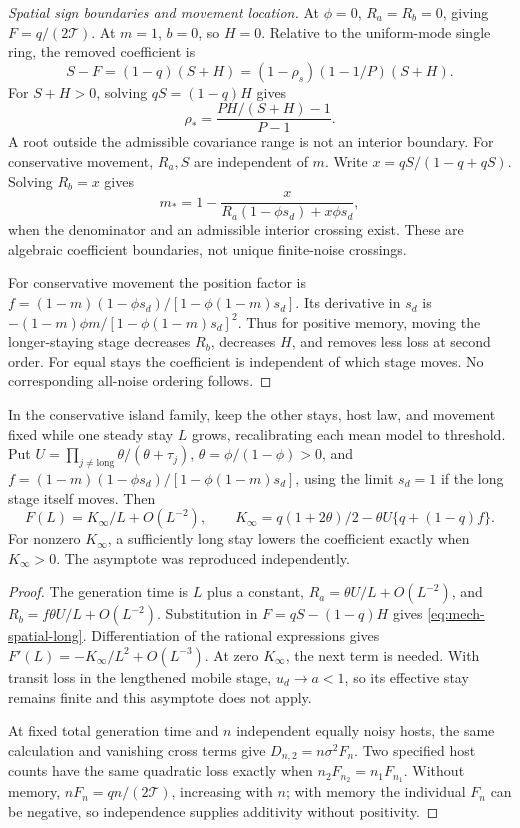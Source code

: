 \begin{proof}[Spatial sign boundaries and movement location]
At \(\phi=0\), \(R_a=R_b=0\), giving \(F=q/(2\mathcal T)\). At \(m=1\), \(b=0\), so \(H=0\). Relative to the uniform-mode single ring, the removed coefficient is
\[
 S-F=(1-q)(S+H)=(1-\rho_s)(1-1/P)(S+H).
\]
For \(S+H>0\), solving \(qS=(1-q)H\) gives
\[
 \rho_* =\frac{PH/(S+H)-1}{P-1}.
\]
A root outside the admissible covariance range is not an interior boundary. For conservative movement, \(R_a,S\) are independent of \(m\). Write \(x=qS/(1-q+qS)\). Solving \(R_b=x\) gives
\[
 m_*=1-\frac{x}{R_a(1-\phi s_d)+x\phi s_d},
\]
when the denominator and an admissible interior crossing exist. These are algebraic coefficient boundaries, not unique finite-noise crossings.

For conservative movement the position factor is
\(f=(1-m)(1-\phi s_d)/[1-\phi(1-m)s_d]\).
Its derivative in \(s_d\) is \(-(1-m)\phi m/[1-\phi(1-m)s_d]^2\). Thus for positive memory, moving the longer-staying stage decreases \(R_b\), decreases \(H\), and removes less loss at second order. For equal stays the coefficient is independent of which stage moves. No corresponding all-noise ordering follows.
\end{proof}

\begin{lemma}\label{lem:mech-spatial-stay}
In the conservative island family, keep the other stays, host law, and movement fixed while one steady stay \(L\) grows, recalibrating each mean model to threshold. Put \(U=\prod_{j\ne\mathrm{long}}\theta/(\theta+\tau_j)\), \(\theta=\phi/(1-\phi)>0\), and \(f=(1-m)(1-\phi s_d)/[1-\phi(1-m)s_d]\), using the limit \(s_d=1\) if the long stage itself moves. Then
\begin{equation}\label{eq:mech-spatial-long}
 F(L)=K_\infty/L+O(L^{-2}),\qquad
 K_\infty=q(1+2\theta)/2-\theta U\{q+(1-q)f\}.
\end{equation}
For nonzero \(K_\infty\), a sufficiently long stay lowers the coefficient exactly when \(K_\infty>0\). The asymptote was reproduced independently.
\end{lemma}
\begin{proof}
The generation time is \(L\) plus a constant, \(R_a=\theta U/L+O(L^{-2})\), and \(R_b=f\theta U/L+O(L^{-2})\). Substitution in \(F=qS-(1-q)H\) gives \eqref{eq:mech-spatial-long}. Differentiation of the rational expressions gives \(F'(L)=-K_\infty/L^2+O(L^{-3})\). At zero \(K_\infty\), the next term is needed. With transit loss in the lengthened mobile stage, \(u_d\to a<1\), so its effective stay remains finite and this asymptote does not apply.

At fixed total generation time and \(n\) independent equally noisy hosts, the same calculation and vanishing cross terms give \(D_{n,2}=n\sigma^2F_n\). Two specified host counts have the same quadratic loss exactly when \(n_2F_{n_2}=n_1F_{n_1}\). Without memory, \(nF_n=qn/(2\mathcal T)\), increasing with \(n\); with memory the individual \(F_n\) can be negative, so independence supplies additivity without positivity.
\end{proof}

